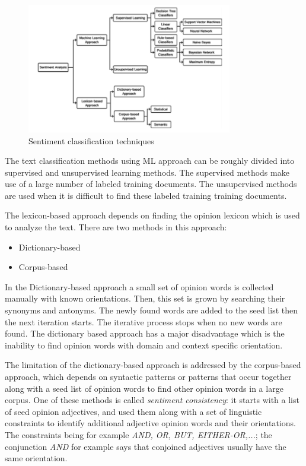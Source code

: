 \begin{figure}[H]
\centering
\includegraphics[width=0.8\textwidth]{./chapters/chapter1/images/sentiment_classification}
\caption{Sentiment classification techniques\cite{survey}}
\label{fig:sentiment_classification}
\end{figure}

The text classification methods using ML approach can be roughly divided into supervised and unsupervised learning methods. The supervised methods make use of a large number of labeled training documents. The unsupervised methods are used when it is difficult to find these labeled training training documents. \par
The lexicon-based approach depends on finding the opinion lexicon which is used to analyze the text. There are two methods in this approach:

\begin{itemize}
\item Dictionary-based
\item Corpus-based
\end{itemize}

In the Dictionary-based approach a small set of opinion words is collected manually with known orientations. Then, this set is grown by searching their synonyms and antonyms. The newly found words are added to the seed list then the next iteration starts. The iterative process stops when no new words are found. The dictionary based approach has a major disadvantage which is the inability to find opinion words with domain and context specific orientation. 

The limitation of the dictionary-based approach is addressed by the corpus-based approach, which depends on syntactic patterns or patterns that occur together along with a seed list of opinion words to find other opinion words in a large corpus. One of these methods is called \textit{sentiment consistency}: it starts with a list of seed opinion adjectives, and used them along with a set of linguistic constraints to identify additional adjective opinion words and their orientations. The constraints being for example \textit{AND, OR, BUT, EITHER-OR,...}; the conjunction \textit{AND} for example says that conjoined adjectives usually have the same orientation. \par

